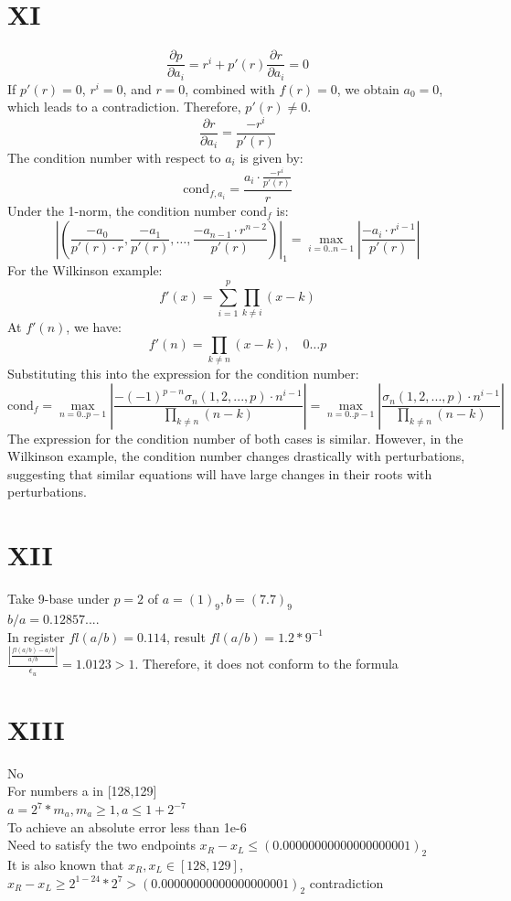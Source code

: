 \documentclass[a4paper]{article}
\begin{document}
\section*{XI}
\[
\frac{\partial p}{\partial a_i} = r^i + p'(r) \frac{\partial r}{\partial a_i} = 0
\]
If \( p'(r) = 0 \), \( r^i = 0 \), and \( r = 0 \), combined with \( f(r) = 0 \), we obtain \( a_0 = 0 \), which leads to a contradiction. Therefore, \( p'(r) \neq 0 \).\\
\[
\frac{\partial r}{\partial a_i} = \frac{-r^i}{p'(r)}
\]
The condition number with respect to \( a_i \) is given by:\\
\[
\text{cond}_{f,a_i} = \frac{a_i \cdot \frac{-r^i}{p'(r)}}{r}
\]
Under the 1-norm, the condition number \( \text{cond}_f \) is:\\
\[
\left| \left( \frac{-a_0}{p'(r) \cdot r}, \frac{-a_1}{p'(r)}, \dots, \frac{-a_{n-1} \cdot r^{n-2}}{p'(r)} \right) \right|_1 = \max_{i=0..n-1} \left| \frac{-a_i \cdot r^{i-1}}{p'(r)} \right|
\]
For the Wilkinson example:\\
\[
f'(x) = \sum_{i=1}^p \prod_{k \neq i} (x - k)
\]
At \( f'(n) \), we have:
\[
f'(n) = \prod_{k \neq n} (x - k), \quad 0 \dots p
\]
Substituting this into the expression for the condition number:\\
\[
\text{cond}_f = \max_{n=0..p-1} \left| \frac{-(-1)^{p-n} \sigma_n(1,2,...,p) \cdot n^{i-1}}{\prod_{k \neq n} (n - k)} \right| = \max_{n=0..p-1} \left| \frac{\sigma_n(1,2,...,p) \cdot n^{i-1}}{\prod_{k \neq n} (n - k)} \right|
\]
The expression for the condition number of both cases is similar. However, in the Wilkinson example, the condition number changes drastically with perturbations, suggesting that similar equations will have large changes in their roots with perturbations.\\



\section*{XII}
Take 9-base under $p=2$ of $a=(1)_9,b=(7.7)_9$\\
$b/a=0.12857....$\\
In register $fl(a/b)=0.114$, result $fl(a/b)=1.2*9^{-1}$\\
$\frac{|\frac{fl(a/b)-a/b}{a/b}|}{\epsilon_u}=1.0123>1.$ Therefore, it does not conform to the formula\\

\section*{XIII}
No\\
For numbers a in [128,129]\\
$a=2^7*m_a,m_a\geq 1,a\leq 1+2^{-7}$\\
To achieve an absolute error less than 1e-6\\
Need to satisfy the two endpoints $x_R-x_L \leq (0.00000000000000000001)_2$\\
It is also known that $x_R,x_L\in [128,129]$, $x_R-x_L \geq 2^{1-24}*2^7>(0.00000000000000000001)_2$ contradiction\\
\end{document}
